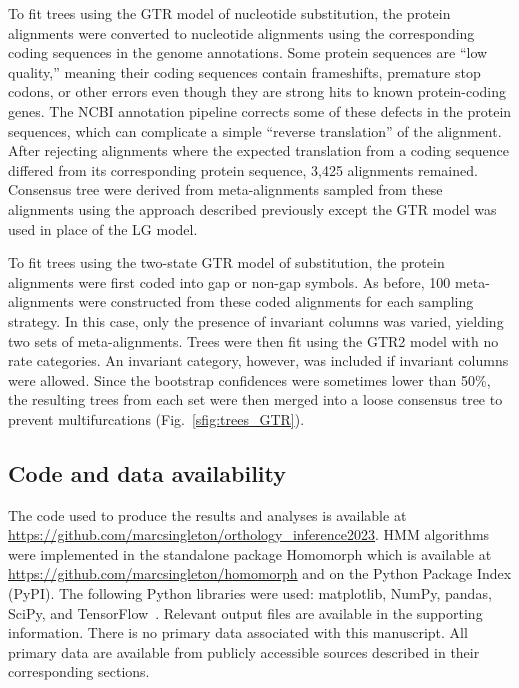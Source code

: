 To fit trees using the GTR model of nucleotide substitution, the protein alignments were converted to nucleotide alignments using the corresponding coding sequences in the genome annotations. Some protein sequences are “low quality,” meaning their coding sequences contain frameshifts, premature stop codons, or other errors even though they are strong hits to known protein-coding genes. The NCBI annotation pipeline corrects some of these defects in the protein sequences, which can complicate a simple “reverse translation” of the alignment. After rejecting alignments where the expected translation from a coding sequence differed from its corresponding protein sequence, 3,425 alignments remained. Consensus tree were derived from meta-alignments sampled from these alignments using the approach described previously except the GTR model was used in place of the LG model.

To fit trees using the two-state GTR model of substitution, the protein alignments were first coded into gap or non-gap symbols. As before, 100 meta-alignments were constructed from these coded alignments for each sampling strategy. In this case, only the presence of invariant columns was varied, yielding two sets of meta-alignments. Trees were then fit using the GTR2 model with no rate categories. An invariant category, however, was included if invariant columns were allowed. Since the bootstrap confidences were sometimes lower than 50\%, the resulting trees from each set were then merged into a loose consensus tree to prevent multifurcations (Fig.~\ref{sfig:trees_GTR}).

\subsection*{Code and data availability}
\begin{sloppypar}
The code used to produce the results and analyses is available at \url{https://github.com/marcsingleton/orthology_inference2023}. HMM algorithms were implemented in the standalone package Homomorph which is available at \url{https://github.com/marcsingleton/homomorph} and on the Python Package Index (PyPI). The following Python libraries were used: matplotlib, NumPy, pandas, SciPy, and TensorFlow~\cite{Hunter2007, Harris2020, McKinney2010, Virtanen2020, Abadi2015}. Relevant output files are available in the supporting information. There is no primary data associated with this manuscript. All primary data are available from publicly accessible sources described in their corresponding sections.
\end{sloppypar}
